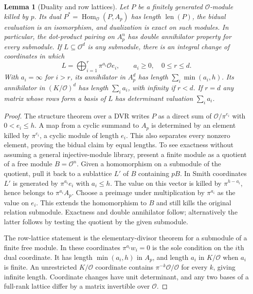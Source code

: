\documentclass[11pt]{article}
\newtheorem{lemma}[theorem]{Lemma}
\newcommand{\Ocal}{\mathcal O}
\newcommand{\len}{\operatorname{len}}
\newcommand{\Hom}{\operatorname{Hom}}
\begin{document}
\begin{lemma}[Duality and row lattices]\label{lem:duality}
Let $P$ be a finitely generated $\Ocal$-module killed by $p$. Its dual $P^*=\Hom_{\Ocal}(P,A_p)$ has length $\len(P)$, the bidual evaluation is an isomorphism, and dualization is exact on such modules. In particular, the dot-product pairing on $A_p^n$ has double annihilator property for every submodule. If $L\subseteq\Ocal^d$ is any submodule, there is an integral change of coordinates in which
\[
 L=\bigoplus_{i=1}^r\pi^{a_i}\Ocal e_i,
 \qquad a_i\ge0,\quad 0\le r\le d.
\]
With $a_i=\infty$ for $i>r$, its annihilator in $A_p^d$ has length $\sum_i\min(a_i,h)$. Its annihilator in $(K/\Ocal)^d$ has length $\sum_i a_i$, with infinity if $r<d$. If $r=d$ any matrix whose rows form a basis of $L$ has determinant valuation $\sum_i a_i$.
\end{lemma}
\begin{proof}
The structure theorem over a DVR writes $P$ as a direct sum of $\Ocal/\pi^{e_i}$ with $0<e_i\le h$. A map from a cyclic summand to $A_p$ is determined by an element killed by $\pi^{e_i}$, a cyclic module of length $e_i$. This also separates every nonzero element, proving the bidual claim by equal lengths. To see exactness without assuming a general injective-module library, present a finite module as a quotient of a free module $B=\Ocal^n$. Given a homomorphism on a submodule of the quotient, pull it back to a sublattice $L'$ of $B$ containing $pB$. In Smith coordinates $L'$ is generated by $\pi^{a_i}e_i$ with $a_i\le h$. The value on this vector is killed by $\pi^{h-a_i}$, hence belongs to $\pi^{a_i}A_p$. Choose a preimage under multiplication by $\pi^{a_i}$ as the value on $e_i$. This extends the homomorphism to $B$ and still kills the original relation submodule. Exactness and double annihilator follow; alternatively the latter follows by testing the quotient by the given submodule.

The row-lattice statement is the elementary-divisor theorem for a submodule of a finite free module. In these coordinates $\pi^{a_i}w_i=0$ is the sole condition on the $i$th dual coordinate. It has length $\min(a_i,h)$ in $A_p$, and length $a_i$ in $K/\Ocal$ when $a_i$ is finite. An unrestricted $K/\Ocal$ coordinate contains $\pi^{-k}\Ocal/\Ocal$ for every $k$, giving infinite length. Coordinate changes have unit determinant, and any two bases of a full-rank lattice differ by a matrix invertible over $\Ocal$.
\end{proof}
\end{document}
